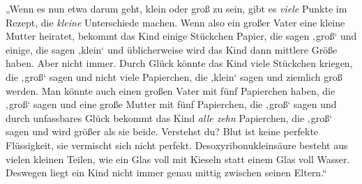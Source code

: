 „Wenn es nun etwa darum geht, klein oder groß zu sein, gibt es \emph{viele} Punkte im Rezept, die \emph{kleine} Unterschiede machen. Wenn also ein großer Vater eine kleine Mutter heiratet, bekommt das Kind einige Stückchen Papier, die sagen ‚groß‘ und einige, die sagen ‚klein‘ und üblicherweise wird das Kind dann mittlere Größe haben. Aber nicht immer. Durch Glück könnte das Kind viele Stückchen kriegen, die ‚groß‘ sagen und nicht viele Papierchen, die ‚klein‘ sagen und ziemlich groß werden. Man könnte auch einen großen Vater mit fünf Papierchen haben, die ‚groß‘ sagen und eine große Mutter mit fünf Papierchen, die ‚groß‘ sagen und durch unfassbares Glück bekommt das Kind \emph{alle zehn} Papierchen, die ‚groß‘ sagen und wird größer als sie beide. Verstehst du? Blut ist keine perfekte Flüssigkeit, sie vermischt sich nicht perfekt. Desoxyribonukleinsäure besteht aus vielen kleinen Teilen, wie ein Glas voll mit Kieseln statt einem Glas voll Wasser. Deswegen liegt ein Kind nicht immer genau mittig zwischen seinen Eltern.“

